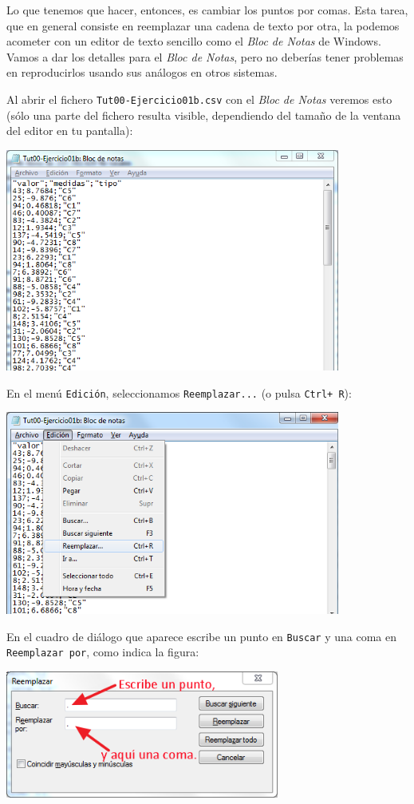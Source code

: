 \documentclass[10pt,a4paper]{article}
\begin{document}
Lo que tenemos que hacer, entonces, es cambiar los puntos por comas. Esta tarea, que en general
consiste en reemplazar una cadena de texto por otra, la podemos acometer con un editor de texto
sencillo como el {\em Bloc de Notas} de Windows. Vamos a dar los detalles para el {\em Bloc de
Notas}, pero no deberías tener problemas en reproducirlos  usando sus análogos en otros sistemas.

Al abrir el fichero {\tt Tut00-Ejercicio01b.csv} con el {\em Bloc de Notas} veremos esto (sólo una
parte del fichero resulta visible, dependiendo del tamaño de la ventana del editor en tu pantalla):
        \begin{center}
        \includegraphics[width=11cm]{../fig/Tut00-EjercicioI-a.png}
        \end{center}
En el menú {\tt Edición}, seleccionamos {\tt Reemplazar...} (o pulsa {\tt Ctrl+ R}):
        \begin{center}
        \includegraphics[width=11cm]{../fig/Tut00-EjercicioI-b.png}
        \end{center}
En el cuadro de diálogo que aparece escribe un punto en {\tt Buscar} y una coma en {\tt Reemplazar
por}, como indica la figura:
        \begin{center}
        \includegraphics[width=9cm]{../fig/Tut00-EjercicioI-c.png}
        \end{center}
\end{document}
